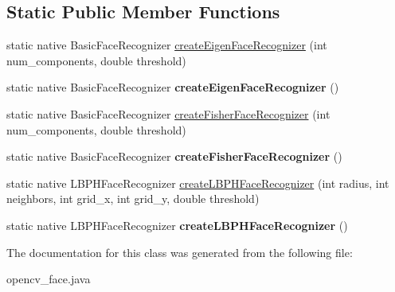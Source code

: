 \subsection*{Static Public Member Functions}
\begin{DoxyCompactItemize}
\item 
static native Basic\+Face\+Recognizer \hyperlink{group__face_ga6f3a56396530d46af3fba9ad04fc80cf}{create\+Eigen\+Face\+Recognizer} (int num\+\_\+components, double threshold)
\item 
static native Basic\+Face\+Recognizer {\bfseries create\+Eigen\+Face\+Recognizer} ()
\item 
static native Basic\+Face\+Recognizer \hyperlink{group__face_ga80a98f353dd2ef661444e0d79bbe9daf}{create\+Fisher\+Face\+Recognizer} (int num\+\_\+components, double threshold)
\item 
static native Basic\+Face\+Recognizer {\bfseries create\+Fisher\+Face\+Recognizer} ()
\item 
static native L\+B\+P\+H\+Face\+Recognizer \hyperlink{group__face_ga970c161034e055fb56615aadba87ac4e}{create\+L\+B\+P\+H\+Face\+Recognizer} (int radius, int neighbors, int grid\+\_\+x, int grid\+\_\+y, double threshold)
\item 
static native L\+B\+P\+H\+Face\+Recognizer {\bfseries create\+L\+B\+P\+H\+Face\+Recognizer} ()
\end{DoxyCompactItemize}


The documentation for this class was generated from the following file\+:\begin{DoxyCompactItemize}
\item 
opencv\+\_\+face.\+java\end{DoxyCompactItemize}
